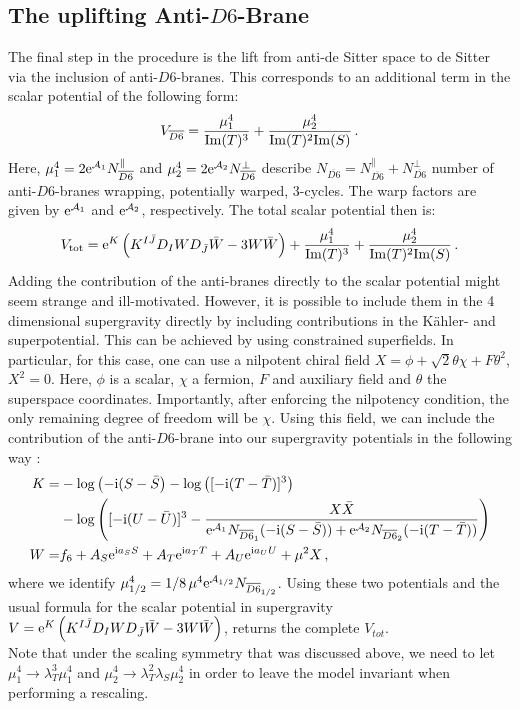 \documentclass[12pt]{report}
\newcommand{\be}{\begin{equation}}
\newcommand{\ee}{\end{equation}}
\newcommand{\bea}{\begin{equation}\begin{aligned}}
\newcommand{\eea}{\end{aligned}\end{equation}}
\def\rmi{{\rm i}}
\def\rme{{\rm e}}
\def\rmim{{\rm Im}}
\begin{document}
\subsection{The uplifting Anti-$D6$-Brane}
The final step in the procedure is the lift from anti-de Sitter space to de Sitter via the inclusion of anti-$D6$-branes. This corresponds to an additional term in the scalar potential of the following form:
\be 
V_{\overline{D6}} = \frac{\mu_1^4}{\rmim (T)^3} + \frac{\mu_2^4}{\rmim(T)^2\rmim(S)}\,.
\ee
Here, $\mu_1^4 = 2 \rme^{\mathcal{A}_1} N_{\overline{D6}}^\parallel$ and $\mu_2^4 = 2 \rme^{\mathcal{A}_2} N_{\overline{D6}}^\perp$ describe $N_{\overline{D6}} = N_{\overline{D6}}^\parallel + N_{\overline{D6}}^\perp$ number of anti-$D6$-branes wrapping, potentially warped, 3-cycles. The warp factors are given by $\rme^{\mathcal{A}_1}$ and $\rme^{\mathcal{A}_2}$, respectively. The total scalar potential then is:
\be 
V_{\text{tot}} = \rme^K \left( K^{I\bar{J}} D_{I}W D_{\bar{J}} \bar{W} - 3 W \bar{W} \right) + \frac{\mu_1^4}{\rmim (T)^3} + \frac{\mu_2^4}{\rmim(T)^2\rmim(S)}\,.
\label{eq:IIAupliftVtot}
\ee
Adding the contribution of the anti-branes directly to the scalar potential might seem strange and ill-motivated. However, it is possible to include them in the 4 dimensional supergravity directly by including contributions in the Kähler- and superpotential. This can be achieved by using constrained superfields. In particular, for this case, one can use a nilpotent chiral field $X = \phi + \sqrt{2} \theta \chi + F \theta^2$, $X^2=0$. Here, $\phi$ is a scalar, $\chi$ a fermion, $F$ and auxiliary field and $\theta$ the superspace coordinates. Importantly, after enforcing the nilpotency condition, the only remaining degree of freedom will be $\chi$. Using this field, we can include the contribution of the anti-$D6$-brane into our supergravity potentials in the following way \cite{Kallosh:2018nrk}:
\bea 
K = &- \log \left( -\rmi(S-\bar{S}\right) -  \log \left( [-\rmi (T-\bar{T})]^3\right) \\&- \log \left( [-\rmi(U-\bar{U})]^3 - \frac{X \bar{X}}{\rme^{\mathcal{A}_1} N_{\overline{D6}_1} (-\rmi (S-\bar{S})) +\rme^{\mathcal{A}_2} N_{\overline{D6}_2} (-\rmi (T-\bar{T}))}\right)\\
W = &f_6 + A_S \rme^{\rmi a_S S}+ A_T \rme^{\rmi a_T T}+ A_U \rme^{\rmi a_U U} + \mu^2 X\,,
\eea 
where we identify $\mu^4_{1/2} = 1/8\,\mu^4 \rme^{\mathcal{A}_{1/2}} N_{\overline{D6}_{1/2}}$.
Using these two potentials and the usual formula for the scalar potential in supergravity $V = \rme^K \left( K^{I\bar{J}} D_{I}W D_{\bar{J}} \bar{W} - 3 W \bar{W} \right)$, returns the complete $V_{tot}$. \\
Note that under the scaling symmetry that was discussed above, we need to let $ \mu_1^4 \to \lambda_T^3 \mu_1^4 $ and $\mu_2^4 \to \lambda_T^2 \lambda_S\mu_2^4 $ in order to leave the model invariant when performing a rescaling.
\end{document}
